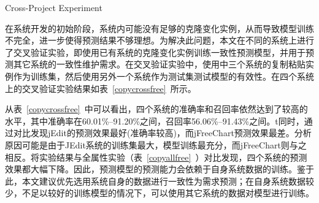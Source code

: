 {Cross-Project Experiment}

在系统开发的初始阶段，系统内可能没有足够的克隆变化实例，从而导致模型训练不完全，进一步使得预测结果不够理想。为解决此问题，本文在不同的系统上进行了交叉验证实验，即使用已有系统的克隆变化实例训练一致性预测模型，并用于预测其它系统的一致性维护需求。在交叉验证实验中，使用中三个系统的复制粘贴实例作为训练集，然后使用另外一个系统作为测试集测试模型的有效性。在四个系统上的交叉验证实验结果如表~\ref{copycrossfree}~所示。

从表~\ref{copycrossfree}~中可以看出，四个系统的准确率和召回率依然达到了较高的水平，其中准确率在60.01\%--91.20\%之间，召回率56.06\%--91.43\%之间。t同时，通过对比发现jEdit的预测效果最好(准确率较高)，而jFreeChart预测效果最差。分析原因可能是由于JEdit系统的训练集最大，模型训练最充分，而jFreeChart则与之相反。将实验结果与全属性实验（表~\ref{copyallfree}~）对比发现，四个系统的预测效果都大幅下降。因此，预测模型的预测能力会依赖于自身系统数据的训练。鉴于此，本文建议优先选用系统自身的数据进行一致性为需求预测；在自身系统数据较少，不足以较好的训练模型的情况下，可以使用其它系统的数据对模型进行训练。

